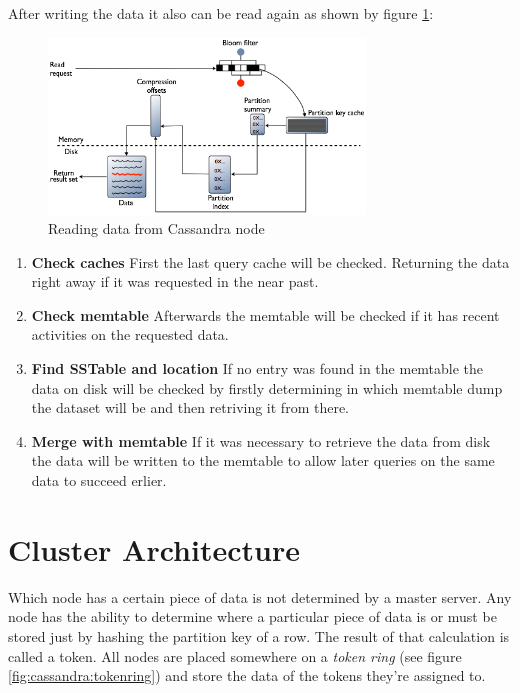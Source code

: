 After writing the data it also can be read again as shown by figure \ref{fig:cassandra:readData}:
\begin{figure}[ht]
    \centering
    \includegraphics[width=0.75\textwidth]{img/cassandra_local_read.png}
    \caption{Reading data from Cassandra node \autocite{datastaxReadData}}
    \label{fig:cassandra:readData}
\end{figure}
\begin{enumerate}
    \item \textbf{Check caches} First the last query cache will be checked. Returning the data right away if it was requested in the near past.
    \item \textbf{Check memtable} Afterwards the memtable will be checked if it has recent activities on the requested data.
    \item \textbf{Find SSTable and location} If no entry was found in the memtable the data on disk will be checked by firstly determining in which memtable dump the dataset will be and then retriving it from there.
    \item \textbf{Merge with memtable} If it was necessary to retrieve the data from disk the data will be written to the memtable to allow later queries on the same data to succeed erlier.
\end{enumerate}

\section{Cluster Architecture}\label{sec:CassandraClusterArchitecture}  %
Which node has a certain piece of data is not determined by a master server. Any node has the ability to determine where a particular piece of data is or must be stored just by hashing the partition key of a row. The result of that calculation is called a token. All nodes are placed somewhere on a \textit{token ring} (see figure \ref{fig:cassandra:tokenring}) and store the data of the tokens they're assigned to.

